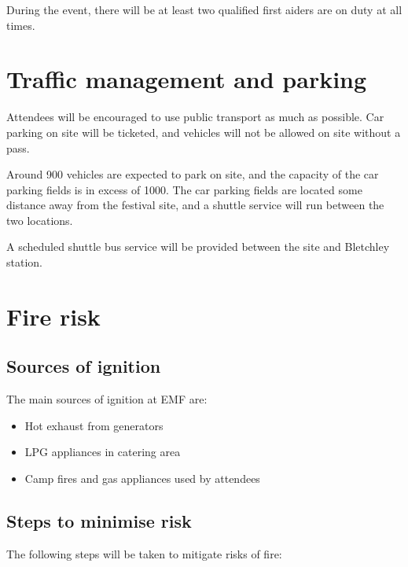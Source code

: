 During the event, there will be at least two qualified first aiders are on duty at all times.

\section{Traffic management and parking}

Attendees will be encouraged to use public transport as much as possible. Car parking on site will be ticketed,
and vehicles will not be allowed on site without a pass.

Around 900 vehicles are expected to park on site, and the capacity of the car parking fields is in excess of 1000.
The car parking fields are located some distance away from the festival site, and a shuttle service will run between
the two locations.

A scheduled shuttle bus service will be provided between the site and Bletchley station.
\section{Fire risk}
\subsection{Sources of ignition}

The main sources of ignition at EMF are:

\begin{itemize}
\item Hot exhaust from generators
\item LPG appliances in catering area
\item Camp fires and gas appliances used by attendees
\end{itemize}

\subsection{Steps to minimise risk}
The following steps will be taken to mitigate risks of fire:


